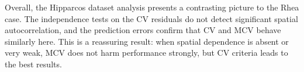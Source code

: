 \documentclass[12pt]{report} %
\newcommand{\bX}{\mathbf{X}}
\begin{document}
Overall, the Hipparcos dataset analysis presents a contrasting picture to the Rhea case. The independence tests on the CV residuals do not detect significant spatial autocorrelation, and the prediction errors confirm that CV and MCV behave similarly here. This is a reassuring result: when spatial dependence is absent or very weak, MCV does not harm performance strongly, but CV criteria leads to the best results.

\end{document}

